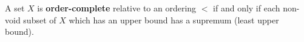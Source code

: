 A set $X$ is \textbf{order-complete} relative to an ordering $<$ if and only if each non-void subset of $X$ which has an upper bound has a supremum (least upper bound).
